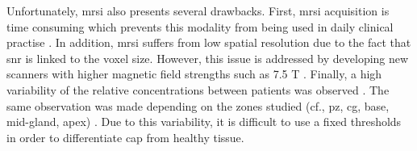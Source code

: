 Unfortunately, \ac{mrsi} also presents several drawbacks.
First, \ac{mrsi} acquisition is time consuming which prevents this modality from being used in daily clinical practise \cite{Barentsz2012}.
In addition, \ac{mrsi} suffers from low spatial resolution due to the fact that \ac{snr} is linked to the voxel size.
However, this issue is addressed by developing new scanners with higher magnetic field strengths such as 7.5 T \cite{Giskeodegard2013}.
Finally, a high variability of the relative concentrations between patients was observed \cite{Choi2007}.
The same observation was made depending on the zones studied (cf., \ac{pz}, \ac{cg}, base, mid-gland, apex) \cite{Walker2010,Lemaitre2011}.
Due to this variability, it is difficult to use a fixed thresholds in order to differentiate \ac{cap} from healthy tissue.


